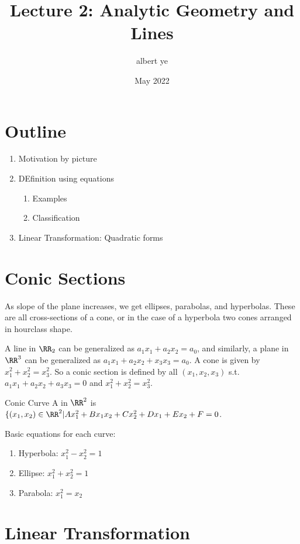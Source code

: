 \documentclass{scrartcl}
\title{Lecture 2: Analytic Geometry and Lines}
\author{albert ye}
\date{May 2022}
\begin{document}
\maketitle
\section{Outline}
\begin{enumerate}
	\item Motivation by picture
	\item DEfinition using equations
		\begin{enumerate}
			\item Examples
			\item Classification
		\end{enumerate}
	\item Linear Transformation: Quadratic forms
\end{enumerate}

\section{Conic Sections}
As slope of the plane increases, we get ellipses, parabolas, and hyperbolas. These are all
cross-sections of a cone, or in the case of a hyperbola two cones arranged in hourclass shape.

A line in $\RR_2$ can be generalized as $a_1x_1 + a_2x_2 = a_0$, and similarly, a plane in $\RR^3$ 
can be generalized as $a_1x_1 + a_2x_2 + x_3x_3 = a_0$. A cone is given by $x_1^2 + x_2^2 = x_3^2$. 
So a conic section is defined by all $(x_1, x_2, x_3)$ s.t. $a_1x_1 + a_2x_2 + a_3x_3 = 0$ and
$x_1^2 + x_2^2 = x_3^2$.

\begin{definition}{Conic Curve}
	A  in $\RR^2$ is $\{(x_1, x_2) \in \RR^2 | Ax_1^2 
		+ Bx_1x_2 + Cx_2^2 + Dx_1 + Ex_2 + F = 0$.
\end{definition}

Basic equations for each curve:
\begin{enumerate}
	\item Hyperbola: $x_1^2 - x_2^2 = 1$
	\item Ellipse: $x_1^2 + x_2^2 = 1$
	\item Parabola: $x_1^2 = x_2$
\end{enumerate}

\section{Linear Transformation}
\end{document}
